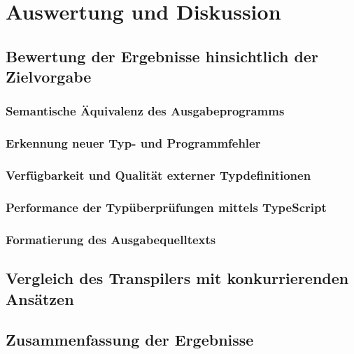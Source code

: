 \chapter{Auswertung und Diskussion}
\label{chap:evaluation}

\section{Bewertung der Ergebnisse hinsichtlich der Zielvorgabe}

  \subsection{Semantische Äquivalenz des Ausgabeprogramms}

  \subsection{Erkennung neuer Typ- und Programmfehler}

  \subsection{Verfügbarkeit und Qualität externer Typdefinitionen}

  \subsection{Performance der Typüberprüfungen mittels TypeScript}

  \subsection{Formatierung des Ausgabequelltexts}

\section{Vergleich des Transpilers mit konkurrierenden Ansätzen}

\section{Zusammenfassung der Ergebnisse}
